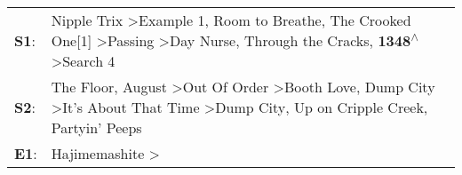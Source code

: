 \begin{supertabular}{p{0.03\textwidth}p{0.92\textwidth}}
 \textbf{S1}:  &  Nipple Trix\textsuperscript{} \textgreater \enspace Example 1\textsuperscript{}, \enspace Room to Breathe\textsuperscript{}, \enspace The Crooked One[1]\textsuperscript{} \textgreater \enspace Passing\textsuperscript{} \textgreater \enspace Day Nurse\textsuperscript{}, \enspace Through the Cracks\textsuperscript{}, \enspace \textbf{1348\textsuperscript{$\wedge$}} \textgreater \enspace Search 4\textsuperscript{}  \enspace  \\
 \textbf{S2}:  &          The Floor\textsuperscript{}, \enspace August\textsuperscript{} \textgreater \enspace Out Of Order\textsuperscript{} \textgreater \enspace Booth Love\textsuperscript{}, \enspace Dump City\textsuperscript{} \textgreater \enspace It's About That Time\textsuperscript{} \textgreater \enspace Dump City\textsuperscript{}, \enspace Up on Cripple Creek\textsuperscript{}, \enspace Partyin' Peeps\textsuperscript{}  \enspace  \\
 \textbf{E1}:  &                                                                                                                                                                                                                                                                                                                                                    Hajimemashite\textsuperscript{} \textgreater {}\textsuperscript{}  \enspace  \\
\end{supertabular}

